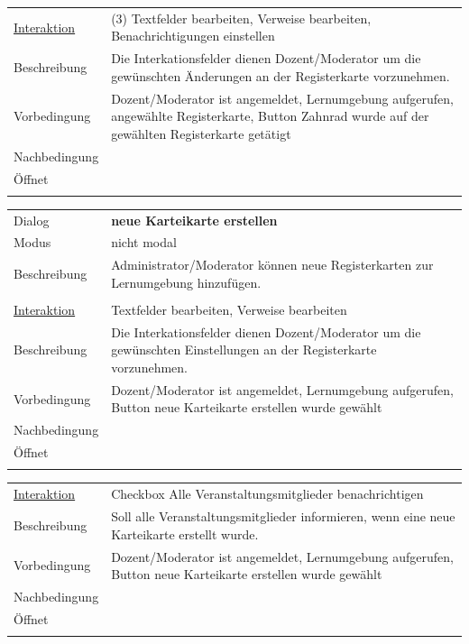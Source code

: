 \documentclass[12pt,a4paper]{article}
\begin{document}
{\begin{tabular}{l p{12cm}}
\underline{Interaktion} & (3) Textfelder bearbeiten, Verweise bearbeiten, Benachrichtigungen einstellen  \\ 
Beschreibung   	 		& Die Interkationsfelder dienen Dozent/Moderator um die gewünschten Änderungen an der Registerkarte vorzunehmen. \\
Vorbedingung	 		& Dozent/Moderator ist angemeldet, Lernumgebung aufgerufen, angewählte Registerkarte, Button Zahnrad wurde auf der gewählten Registerkarte getätigt\\
Nachbedingung	 		& \\
Öffnet			 		&  \\\\
\end{tabular}







\begin{tabular}{l p{12cm}}
Dialog 	 		 & \textbf{neue Karteikarte erstellen} \\ 
Modus 			 & nicht modal\\ 
Beschreibung   	 & Administrator/Moderator können neue Registerkarten zur Lernumgebung hinzufügen.\\\\

\underline{Interaktion} & Textfelder bearbeiten, Verweise bearbeiten \\ 
Beschreibung   	 		& Die Interkationsfelder dienen Dozent/Moderator um die gewünschten Einstellungen an der Registerkarte vorzunehmen. \\
Vorbedingung	 		& Dozent/Moderator ist angemeldet, Lernumgebung aufgerufen, Button neue Karteikarte erstellen wurde gewählt \\
Nachbedingung	 		& \\
Öffnet			 		&  \\\\
\end{tabular}

\begin{tabular}{l p{12cm}}
\underline{Interaktion} &  Checkbox Alle Veranstaltungsmitglieder benachrichtigen\\ 
Beschreibung   	 		& Soll alle Veranstaltungsmitglieder informieren, wenn eine neue Karteikarte erstellt wurde.\\
Vorbedingung	 		& Dozent/Moderator ist angemeldet, Lernumgebung aufgerufen, Button neue Karteikarte erstellen wurde gewählt\\
Nachbedingung	 		& \\
Öffnet			 		&  \\\\
\end{tabular}

}
\end{document}
